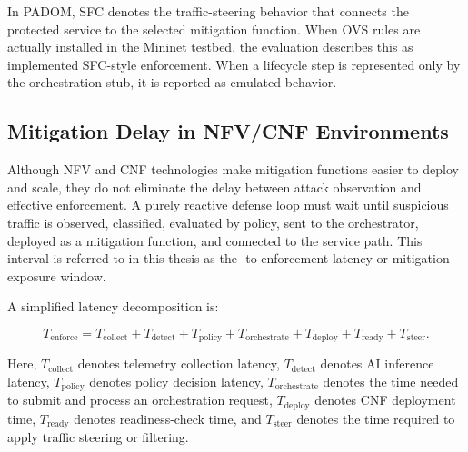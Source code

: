 \documentclass[12pt, a4paper, reqno, oneside]{book}
\newcommand{\padonap}{\textsc{PADOM}}
\begin{document}
In \padonap{}, SFC denotes the traffic-steering behavior that connects the
protected service to the selected mitigation function. When OVS rules are
actually installed in the Mininet testbed, the evaluation describes this as
implemented SFC-style enforcement. When a lifecycle step is represented only
by the orchestration stub, it is reported as emulated behavior.

\subsection{Mitigation Delay in NFV/CNF Environments}
\label{subsec:mitigation-delay-bg}

Although NFV and CNF technologies make mitigation functions easier to deploy
and scale, they do not eliminate the delay between attack observation and
effective enforcement. A purely reactive defense loop must wait until
suspicious traffic is observed, classified, evaluated by policy, sent to the
orchestrator, deployed as a mitigation function, and connected to the service
path. This interval is referred to in this thesis as the
\attack-to-enforcement latency or mitigation exposure window.

A simplified latency decomposition is:

\[
T_{\text{enforce}} =
T_{\text{collect}} +
T_{\text{detect}} +
T_{\text{policy}} +
T_{\text{orchestrate}} +
T_{\text{deploy}} +
T_{\text{ready}} +
T_{\text{steer}}.
\]

Here, \(T_{\text{collect}}\) denotes telemetry collection latency,
\(T_{\text{detect}}\) denotes AI inference latency, \(T_{\text{policy}}\)
denotes policy decision latency, \(T_{\text{orchestrate}}\) denotes the time
needed to submit and process an orchestration request, \(T_{\text{deploy}}\)
denotes CNF deployment time, \(T_{\text{ready}}\) denotes readiness-check time,
and \(T_{\text{steer}}\) denotes the time required to apply traffic steering or
filtering.

\end{document}
